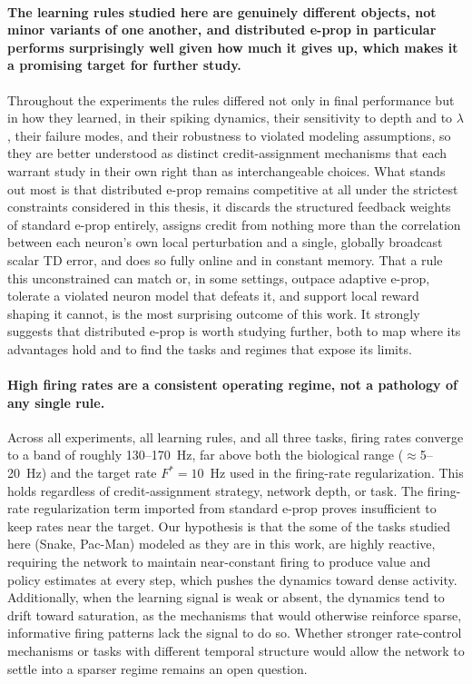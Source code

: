 \paragraph{The learning rules studied here are genuinely different objects, not minor variants of one
another, and distributed e-prop in particular performs surprisingly well given how much it gives up,
which makes it a promising target for further study.} Throughout the experiments the rules differed
not only in final performance but in how they learned, in their spiking dynamics, their sensitivity
to depth and to $\lambda$, their failure modes, and their robustness to violated modeling
assumptions, so they are better understood as distinct credit-assignment mechanisms that each
warrant study in their own right than as interchangeable choices. What stands out most is that
distributed e-prop remains competitive at all under the strictest constraints considered in this
thesis, it discards the structured feedback weights of standard e-prop entirely, assigns credit from
nothing more than the correlation between each neuron's own local perturbation and a single,
globally broadcast scalar TD error, and does so fully online and in constant memory. That a rule this
unconstrained can match or, in some settings, outpace adaptive e-prop, tolerate a violated neuron
model that defeats it, and support local reward shaping it cannot, is the most surprising outcome of
this work. It strongly suggests that distributed e-prop is worth studying further, both to map where
its advantages hold and to find the tasks and regimes that expose its limits.

\paragraph{High firing rates are a consistent operating regime, not a
pathology of any single rule.} Across all experiments, all learning rules, and
all three tasks, firing rates converge to a band of roughly 130--170~Hz,
far above both the biological range ($\approx$5--20~Hz) and the target rate
$F^* = 10$~Hz used in the firing-rate regularization. This holds regardless of
credit-assignment strategy, network depth, or task. The firing-rate
regularization term imported from standard e-prop proves insufficient to keep
rates near the target. Our hypothesis is that the some of the tasks studied here 
(Snake, Pac-Man) modeled as they are in this work, 
are highly reactive, requiring the network to maintain near-constant 
firing to produce value and policy estimates at every
step, which pushes the dynamics toward dense activity. Additionally, when the
learning signal is weak or absent, the dynamics tend to drift toward
saturation, as the mechanisms that would otherwise
reinforce sparse, informative firing patterns lack the signal to do so.
Whether stronger rate-control mechanisms or tasks with different temporal
structure would allow the network to settle into a sparser regime remains an
open question.


